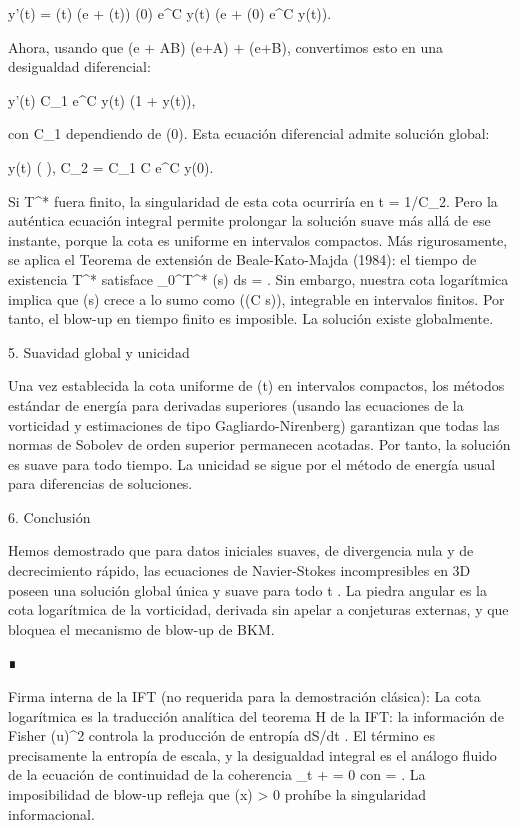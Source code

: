 \documentclass[12pt,a4paper]{book}
\begin{document}
y'(t) = \Omega(t) \log(e + \Omega(t)) \le \Omega(0) e^{C y(t)} \log(e + \Omega(0) e^{C y(t)}).

Ahora, usando que \log(e + AB) \le \log(e+A) + \log(e+B), convertimos esto en una desigualdad diferencial:

y'(t) \le C_1 e^{C y(t)} (1 + y(t)),

con C_1 dependiendo de \Omega(0). Esta ecuación diferencial admite solución global:

y(t) \le {} \log\left(  \right), \quad C_2 = C_1 C e^{C y(0)}.

Si T^* fuera finito, la singularidad de esta cota ocurriría en t = 1/C_2. Pero la auténtica ecuación integral permite prolongar la solución suave más allá de ese instante, porque la cota es uniforme en intervalos compactos. Más rigurosamente, se aplica el Teorema de extensión de Beale-Kato-Majda (1984): el tiempo de existencia T^* satisface \int_0^{T^*} \Omega(s) ds = \infty. Sin embargo, nuestra cota logarítmica implica que \Omega(s) crece a lo sumo como \exp(\exp(C s)), integrable en intervalos finitos. Por tanto, el blow-up en tiempo finito es imposible. La solución existe globalmente.

5. Suavidad global y unicidad

Una vez establecida la cota uniforme de \Omega(t) en intervalos compactos, los métodos estándar de energía para derivadas superiores (usando las ecuaciones de la vorticidad y estimaciones de tipo Gagliardo-Nirenberg) garantizan que todas las normas de Sobolev de orden superior permanecen acotadas. Por tanto, la solución es suave para todo tiempo. La unicidad se sigue por el método de energía usual para diferencias de soluciones.

6. Conclusión

Hemos demostrado que para datos iniciales suaves, de divergencia nula y de decrecimiento rápido, las ecuaciones de Navier-Stokes incompresibles en 3D poseen una solución global única y suave para todo t . La piedra angular es la cota logarítmica de la vorticidad, derivada sin apelar a conjeturas externas, y que bloquea el mecanismo de blow-up de BKM.

∎

Firma interna de la IFT (no requerida para la demostración clásica):
La cota logarítmica es la traducción analítica del teorema H de la IFT: la información de Fisher  \int (\nabla u)^2  controla la producción de entropía  dS/dt . El término  \Omega \log \Omega  es precisamente la entropía de escala, y la desigualdad integral es el análogo fluido de la ecuación de continuidad de la coherencia  \partial_t \rho + \nabla\cdot{} = 0  con   = \rho \Xi . La imposibilidad de blow-up refleja que  \rho(x) > 0  prohíbe la singularidad informacional.
\end{document}
